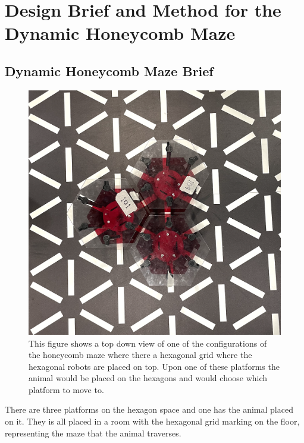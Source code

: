 \section{Design Brief and Method for the Dynamic Honeycomb Maze}



\subsection{Dynamic Honeycomb Maze Brief}
\label{section:design_brief}

\begin{figure}[h]
    \centering
    \includegraphics[scale=0.35]{images/irl_maze.png}
    \caption{This figure shows a top down view of one of the configurations of the honeycomb maze where there a hexagonal grid where the hexagonal robots are placed on top. Upon one of these platforms the animal would be placed on the hexagons and would choose which platform to move to.}
    \label{fig:picture_of_maze}
\end{figure}

There are three platforms on the hexagon space and one has the animal placed on it. They is all placed in a room with the hexagonal grid marking on the floor, representing the maze that the animal traverses.

